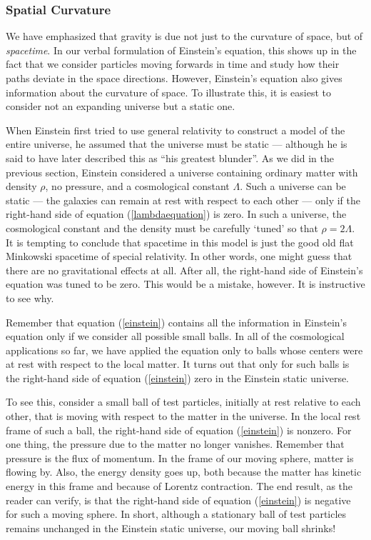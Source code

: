 \subsubsection*{Spatial Curvature}

We have emphasized that gravity is due not just to the 
curvature of space, but of {\it spacetime}.  
In our verbal formulation of Einstein's equation, this shows
up in the fact that we consider particles moving forwards in time 
and study how their paths deviate in the space directions.  
However, Einstein's equation also gives information about
the curvature of space.  To illustrate this, it is easiest
to consider not an expanding universe but a static one.

When Einstein first tried to use general relativity to construct a
model of the entire universe, he assumed that the universe must be
static --- although he is said to have later described this as ``his
greatest blunder''.  As we did in the previous section, Einstein
considered a universe containing ordinary matter with density $\rho$,
no pressure, and a cosmological constant $\Lambda$.  Such a universe
can be static --- the galaxies can remain at rest with respect to each
other --- only if the right-hand side of equation
(\ref{lambdaequation}) is zero.  In such a universe, the cosmological
constant and the density must be carefully `tuned' so that
$\rho=2\Lambda$.  It is tempting to conclude that spacetime in this
model is just the good old flat Minkowski spacetime of special
relativity.  In other words, one might guess that there are no
gravitational effects at all.  After all, the right-hand side of
Einstein's equation was tuned to be zero.  This would be a mistake,
however.  It is instructive to see why.

Remember that equation (\ref{einstein}) contains all the information
in Einstein's equation only if we consider all possible small balls.
In all of the cosmological applications so far, we have applied the
equation only to balls whose centers were at rest with respect to the
local matter.  It turns out that only for such balls is the
right-hand side of equation (\ref{einstein}) zero in the
Einstein static universe.

To see this, consider a small ball of test particles, initially at
rest relative to each other, that is moving with respect to the matter
in the universe.  In the local rest frame of such a ball, the
right-hand side of equation (\ref{einstein}) is nonzero.  For one
thing, the pressure due to the matter no longer vanishes.  Remember
that pressure is the flux of momentum.  In the frame of our moving
sphere, matter is flowing by.  Also, the energy density goes up, both
because the matter has kinetic energy in this frame and because of
Lorentz contraction.  The end result, as the reader can verify, is
that the right-hand side of equation (\ref{einstein}) is negative for
such a moving sphere.  In short, although a stationary ball of test
particles remains unchanged in the Einstein static universe, our
moving ball shrinks!

